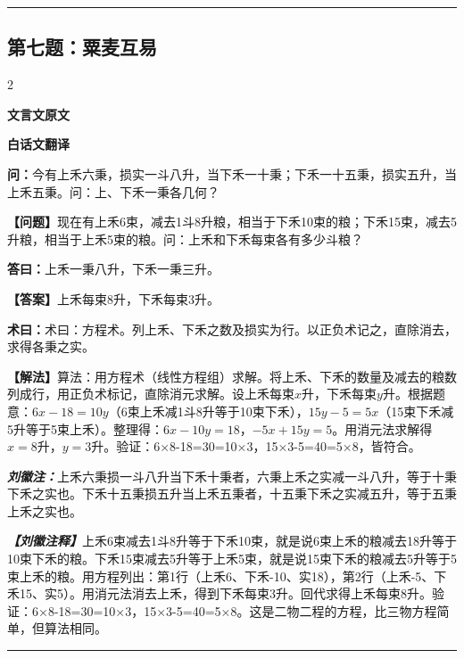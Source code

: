 \documentclass[10pt,a4paper]{article}
\newcommand{\wen}[1]{\textbf{\color{problemcolor}问：}#1\par}
\newcommand{\da}[1]{\textbf{答曰：}#1\par}
\newcommand{\shu}[1]{\textbf{术曰：}#1\par}
\newcommand{\liuhui}[1]{{\color{commentarycolor}\textit{\textbf{刘徽注：}}#1\par}}
\newcommand{\classicalheader}[1]{{\centering\large\bfseries\color{classicalcolor} #1\par\vspace{0.5em}}}
\newcommand{\wenmodern}[1]{\textbf{\color{moderncolor}【问题】}#1\par}
\newcommand{\damodern}[1]{\textbf{【答案】}#1\par}
\newcommand{\shumodern}[1]{\textbf{【解法】}#1\par}
\newcommand{\liuhuimodern}[1]{{\color{commentarycolor}\textit{\textbf{【刘徽注释】}}#1\par}}
\newcommand{\modernheader}[1]{{\centering\large\bfseries\color{moderncolor} #1\par\vspace{0.5em}}}
\newcommand{\problemsec}[1]{\subsection*{#1}}
\begin{document}
\vspace{0.3cm}
\hrule
\vspace{0.3cm}

\problemsec{第七题：粟麦互易}
\begin{paracol}{2}
\classicalheader{文言文原文}
\switchcolumn
\modernheader{白话文翻译}
\switchcolumn*

\wen{今有上禾六秉，损实一斗八升，当下禾一十秉；下禾一十五秉，损实五升，当上禾五秉。问：上、下禾一秉各几何？}

\switchcolumn

\wenmodern{现在有上禾6束，减去1斗8升粮，相当于下禾10束的粮；下禾15束，减去5升粮，相当于上禾5束的粮。问：上禾和下禾每束各有多少斗粮？}

\switchcolumn*

\da{上禾一秉八升，下禾一秉三升。}

\switchcolumn

\damodern{上禾每束8升，下禾每束3升。}

\switchcolumn*

\shu{术曰：方程术。列上禾、下禾之数及损实为行。以正负术记之，直除消去，求得各秉之实。}

\switchcolumn

\shumodern{算法：用方程术（线性方程组）求解。将上禾、下禾的数量及减去的粮数列成行，用正负术标记，直除消元求解。设上禾每束$x$升，下禾每束$y$升。根据题意：$6x-18=10y$（6束上禾减1斗8升等于10束下禾），$15y-5=5x$（15束下禾减5升等于5束上禾）。整理得：$6x-10y=18$，$-5x+15y=5$。用消元法求解得$x=8$升，$y=3$升。验证：6×8-18=30=10×3，15×3-5=40=5×8，皆符合。}

\switchcolumn*

\liuhui{上禾六秉损一斗八升当下禾十秉者，六秉上禾之实减一斗八升，等于十秉下禾之实也。下禾十五秉损五升当上禾五秉者，十五秉下禾之实减五升，等于五秉上禾之实也。}

\switchcolumn

\liuhuimodern{上禾6束减去1斗8升等于下禾10束，就是说6束上禾的粮减去18升等于10束下禾的粮。下禾15束减去5升等于上禾5束，就是说15束下禾的粮减去5升等于5束上禾的粮。用方程列出：第1行（上禾6、下禾-10、实18），第2行（上禾-5、下禾15、实5）。用消元法消去上禾，得到下禾每束3升。回代求得上禾每束8升。验证：6×8-18=30=10×3，15×3-5=40=5×8。这是二物二程的方程，比三物方程简单，但算法相同。}

\end{paracol}

\vspace{0.3cm}
\hrule
\vspace{0.3cm}
\end{document}
